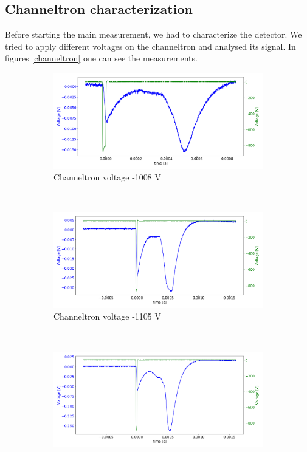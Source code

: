 \documentclass[a4paper,10pt]{article}
\begin{document}
\subsection{Channeltron characterization}
Before starting the main measurement, we had to characterize the detector. We tried to apply different voltages on the channeltron and analysed its signal. In figures \ref{channeltron}
one can see the measurements. 
\begin{figure}[H]
  \centering{}
  \begin{subfigure}[t]{0.45 \textwidth}
    \centering
    \includegraphics[width= \textwidth]{channeltron1}
    \caption{Channeltron voltage -1008 V}\label{channeltron1}
  \end{subfigure}
  ~
  \begin{subfigure}[t]{0.45 \textwidth}
    \centering
    \includegraphics[width=\textwidth]{channeltron2}
    \caption{Channeltron voltage -1105 V}\label{channeltron2}
  \end{subfigure}
  ~
  \begin{subfigure}[t]{0.45 \textwidth}
    \centering
    \includegraphics[width=\textwidth]{channeltron3}

\end{subfigure}
\end{figure}
\end{document}
